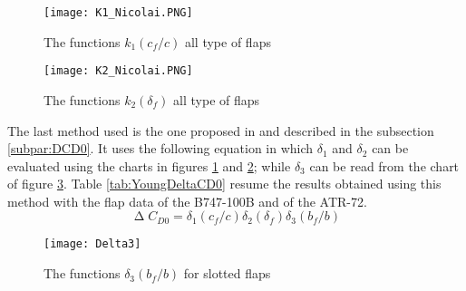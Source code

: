 %
\begin{figure}[H]
\centering
\texttt{[image: K1\_Nicolai.PNG]}
\caption{The functions $k_1\left(c_f/c\right)$ all type of flaps}
\label{fig:K1DeltaCD0}
\end{figure}
%
\begin{figure}[H]
\centering
\texttt{[image: K2\_Nicolai.PNG]}
\caption{The functions $k_2\left(\delta_f\right)$ all type of flaps}
\label{fig:K2DeltaCD0}
\end{figure}
%
\noindent
The last method used is the one proposed in \cite{Young:Flaps} and described in the subsection \ref{subpar:DCD0}. It uses the following equation in which $\delta_1$ and $\delta_2$ can be evaluated using the charts in figures \ref{fig:K1DeltaCD0} and \ref{fig:K2DeltaCD0}; while $\delta_3$ can be read from the chart of figure \ref{fig:Delta3}. Table \ref{tab:YoungDeltaCD0} resume the results obtained using this method with the flap data of the B747-100B and of the ATR-72.
%
\begin{equation}
\upDelta C_{D0}=\delta_1\left(c_f/c\right)\delta_2\left(\delta_f\right)\delta_3\left(b_f/b\right)
\label{eqn:DeltaCD0PartSpan}
\end{equation}
%
\begin{figure}[H]
\centering
\texttt{[image: Delta3]}
\caption{The functions $\delta_3\left(b_f/b\right)$ for slotted flaps}
\label{fig:Delta3}
\end{figure}
%
